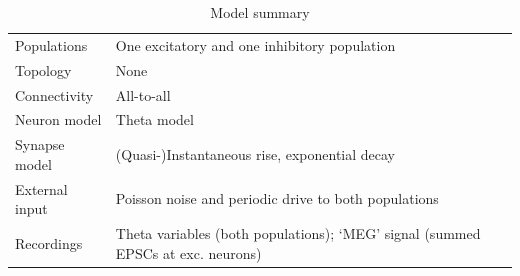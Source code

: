 \documentclass[10pt,a4paper,onecolumn]{article}
\begin{document}
\begin{longtable}[]{@{}ll@{}}
\caption{Model summary }\label{tbl:summary}\tabularnewline
\toprule
\begin{minipage}[t]{0.19\columnwidth}\raggedright\strut
Populations\strut
\end{minipage} & \begin{minipage}[t]{0.75\columnwidth}\raggedright\strut
One excitatory and one inhibitory population\strut
\end{minipage}\tabularnewline
\begin{minipage}[t]{0.19\columnwidth}\raggedright\strut
Topology\strut
\end{minipage} & \begin{minipage}[t]{0.75\columnwidth}\raggedright\strut
None\strut
\end{minipage}\tabularnewline
\begin{minipage}[t]{0.19\columnwidth}\raggedright\strut
Connectivity\strut
\end{minipage} & \begin{minipage}[t]{0.75\columnwidth}\raggedright\strut
All-to-all\strut
\end{minipage}\tabularnewline
\begin{minipage}[t]{0.19\columnwidth}\raggedright\strut
Neuron model\strut
\end{minipage} & \begin{minipage}[t]{0.75\columnwidth}\raggedright\strut
Theta model\strut
\end{minipage}\tabularnewline
\begin{minipage}[t]{0.19\columnwidth}\raggedright\strut
Synapse model\strut
\end{minipage} & \begin{minipage}[t]{0.75\columnwidth}\raggedright\strut
(Quasi-)Instantaneous rise, exponential decay\strut
\end{minipage}\tabularnewline
\begin{minipage}[t]{0.19\columnwidth}\raggedright\strut
External input\strut
\end{minipage} & \begin{minipage}[t]{0.75\columnwidth}\raggedright\strut
Poisson noise and periodic drive to both populations\strut
\end{minipage}\tabularnewline
\begin{minipage}[t]{0.19\columnwidth}\raggedright\strut
Recordings\strut
\end{minipage} & \begin{minipage}[t]{0.75\columnwidth}\raggedright\strut
Theta variables (both populations); `MEG' signal (summed EPSCs at exc.
neurons)\strut
\end{minipage}\tabularnewline
\bottomrule
\end{longtable}
\end{document}
